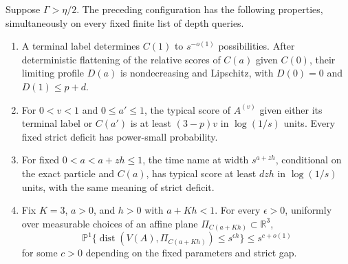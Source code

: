 \begin{lemma}
\label{low:classical-names}
Suppose $\Gamma>\eta/2$. The preceding configuration has the following
properties, simultaneously on every fixed finite list of depth queries.
\begin{enumerate}
\item A terminal label determines $C(1)$ to $s^{-o(1)}$ possibilities.
After deterministic flattening of the relative scores of $C(a)$ given
$C(0)$, their limiting profile $D(a)$ is nondecreasing and Lipschitz,
with $D(0)=0$ and $D(1)\leq p+d$.
\item For $0<v<1$ and $0\leq a'\leq1$, the typical score of
$A^{(v)}$ given either its terminal label or $C(a')$ is at least
$(3-p)v$ in $\log(1/s)$ units. Every fixed strict deficit has power-small
probability.
\item For fixed $0<a<a+zh\leq1$, the time name at width $s^{a+zh}$,
conditional on the exact particle and $C(a)$, has typical score at least
$dzh$ in $\log(1/s)$ units, with the same meaning of strict deficit.
\item Fix $K=3$, $a>0$, and $h>0$ with $a+Kh<1$. For every
$\epsilon>0$, uniformly over measurable choices of an affine plane
$\Pi_{C(a+Kh)}\subset\mathbb R^3$,
\[
 \mathbb P^1\{\operatorname{dist}(V(A),\Pi_{C(a+Kh)})
                  \leq s^{\epsilon h}\}
 \leq s^{c+o(1)}
\]
for some $c>0$ depending on the fixed parameters and strict gap.
\end{enumerate}
\end{lemma}

